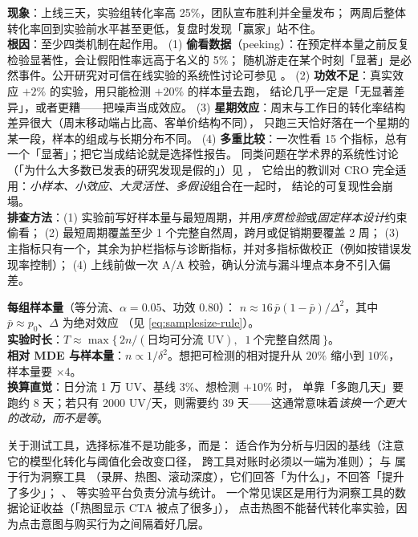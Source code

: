 \begin{pitfall}
\textbf{现象}：上线三天，实验组转化率高 25\%，团队宣布胜利并全量发布；
两周后整体转化率回到实验前水平甚至更低，复盘时发现「赢家」站不住。\\
\textbf{根因}：至少四类机制在起作用。
(1) \textbf{偷看数据}（peeking）：在预定样本量之前反复检验显著性，会让假阳性率远高于名义的 5\%；
随机游走在某个时刻「显著」是必然事件。公开研究对可信在线实验的系统性讨论可参见 \cite{kohavi2020trustworthy}。
(2) \textbf{功效不足}：真实效应 $+2\%$ 的实验，用只能检测 $+20\%$ 的样本量去跑，
结论几乎一定是「无显著差异」，或者更糟——把噪声当成效应。
(3) \textbf{星期效应}：周末与工作日的转化率结构差异很大（周末移动端占比高、客单价结构不同），
只跑三天恰好落在一个星期的某一段，样本的组成与长期分布不同。
(4) \textbf{多重比较}：一次性看 15 个指标，总有一个「显著」；把它当成结论就是选择性报告。
同类问题在学术界的系统性讨论（「为什么大多数已发表的研究发现是假的」）见 \cite{ioannidis2005why}，
它给出的教训对 CRO 完全适用：\emph{小样本、小效应、大灵活性、多假设}组合在一起时，
结论的可复现性会崩塌。\\
\textbf{排查方法}：(1) 实验前写好样本量与最短周期，并用\emph{序贯检验}或\emph{固定样本设计}约束偷看；
(2) 最短周期覆盖至少 1 个完整自然周，跨月或促销期要覆盖 2 周；
(3) 主指标只有一个，其余为护栏指标与诊断指标，并对多指标做校正（例如按错误发现率控制）；
(4) 上线前做一次 A/A 校验，确认分流与漏斗埋点本身不引入偏差。
\end{pitfall}

\begin{formulacard}[A/B 样本量与实验时长的速算]
\textbf{每组样本量}（等分流、$\alpha=0.05$、功效 $0.80$）：
$n \approx 16\,\bar p (1-\bar p)/\Delta^2$，其中 $\bar p \approx p_0$、$\Delta$ 为绝对效应
（见 \cref{eq:samplesize-rule}）。\\
\textbf{实验时长}：$T \approx \max\big\{\,2n / (\text{日均可分流 UV}),\;\; 1\ \text{个完整自然周}\,\big\}$。\\
\textbf{相对 MDE 与样本量}：$n \propto 1/\delta^2$。想把可检测的相对提升从 $20\%$ 缩小到 $10\%$，
样本量要 $\times 4$。\\
\textbf{换算直觉}：日分流 1 万 UV、基线 $3\%$、想检测 $+10\%$ 时，
单靠「多跑几天」要跑约 8 天；若只有 2000 UV/天，则需要约 39 天——这通常意味着\emph{该换一个更大的改动，而不是等}。
\end{formulacard}

关于测试工具，选择标准不是功能多，而是：
 适合作为分析与归因的基线（注意它的模型化转化与阈值化会改变口径，
跨工具对账时必须以一端为准则）； 与  属于行为洞察工具
（录屏、热图、滚动深度），它们回答「为什么」，不回答「提升了多少」；
、 等实验平台负责分流与统计。
一个常见误区是用行为洞察工具的数据论证收益（「热图显示 CTA 被点了很多」），
点击热图不能替代转化率实验，因为点击意图与购买行为之间隔着好几层。

